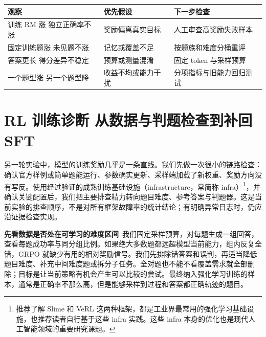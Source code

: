 \begin{longtable}[]{@{}
  >{\raggedright\arraybackslash}p{}
  >{\raggedright\arraybackslash}p{}
  >{\raggedright\arraybackslash}p{}@{}}
\toprule\noalign{}
\begin{minipage}[b]{\linewidth}\raggedright
\textbf{观察}
\end{minipage} & \begin{minipage}[b]{\linewidth}\raggedright
\textbf{优先假设}
\end{minipage} & \begin{minipage}[b]{\linewidth}\raggedright
\textbf{下一步检查}
\end{minipage} \\
\midrule\noalign{}
\endhead
\bottomrule\noalign{}
\endlastfoot
训练 RM 涨 独立正确率不涨 & 奖励偏离真实目标 & 人工审查高奖励失败样本 \\
固定训练题涨 未见题不涨 & 记忆或覆盖不足 & 按题族和难度分桶重评 \\
答案更长 得分差异不稳定 & 预算或测量混淆 & 固定 token 与采样预算 \\
一个题型涨 另一个题型降 & 收益不均或能力干扰 & 分项指标与旧能力回归测试 \\
\end{longtable}


\section{RL 训练诊断 从数据与判题检查到补回 SFT}\label{RL 训练诊断 从数据与判题检查到补回 SFT}

另一轮实验中，模型的训练奖励几乎是一条直线。我们先做一次很小的链路检查：确认官方样例或简单题能运行、参数确实更新、采样端加载了新权重、奖励方向没有写反。使用经过验证的成熟训练基础设施（infrastructure，常简称 infra）\footnote{推荐了解 Slime 和 VeRL 这两种框架，都是工业界最常用的强化学习基础设施，也推荐读者自行基于这些 infra 实践。这些 infra 本身的优化也是现代人工智能领域的重要研究课题。}，并确认关键配置后，我们把主要排查精力转向题目难度、参考答案与判题器。这是当前实验的排查顺序，不是对所有框架故障率的统计结论；有明确异常日志时，仍应沿证据检查实现。

\textbf{先看数据是否处在可学习的难度区间}~我们固定采样预算，对每题生成一组回答，查看每题成功率与同分组比例。如果绝大多数题都远超模型当前能力，组内反复全错，GRPO 就缺少有用的相对奖励信号。我们先排除错答案和误判，再适当降低题目难度、补充中间难度题或拆分子任务。全对题也不能不看覆盖需求就全部删除；目标是让当前策略有机会产生可以比较的尝试。最终纳入强化学习训练的样本，通常是正确率不那么高，但是能够采样到过程和答案都正确轨迹的题目。

